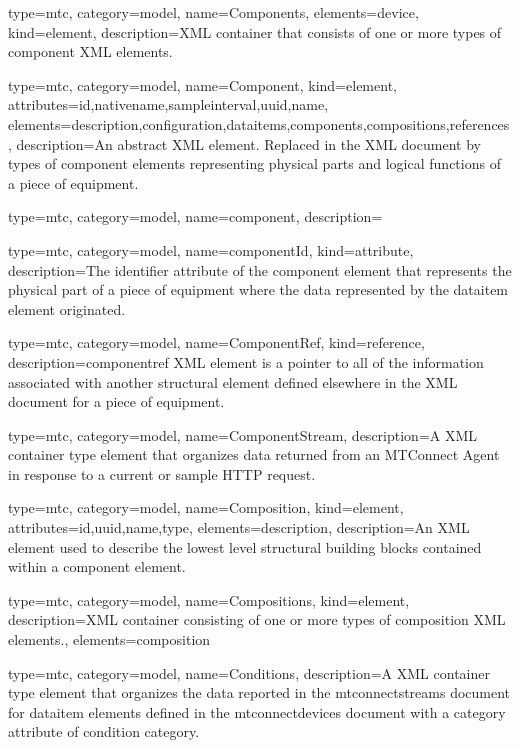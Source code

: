 {
  type=mtc,
  category=model,
  name={Components},
  elements={\gls{device}},
  kind={element},
  description={XML container that consists of one or more types of \gls{component} XML elements. } 
}


{
  type=mtc,
  category=model,
  name={Component},
  kind={element},
  attributes={\gls{id},\gls{nativename},\gls{sampleinterval},\gls{uuid},\gls{name}},
  elements={\gls{description},\gls{configuration},\gls{dataitems},\gls{components},\glspl{composition},\gls{references}},
  description={An abstract XML element. Replaced in the XML document by types of \gls{component} elements representing physical parts and logical functions of a piece of equipment.}
}


{
  type=mtc,
  category=model,
  name={component},
  description={}
}


{
  type=mtc,
  category=model,
  name={componentId},
  kind={attribute},
  description={The identifier attribute of the \gls{component} element that represents the physical part of a piece of equipment where the data represented by the \gls{dataitem} element originated.}
}


{
  type=mtc,
  category=model,
  name={ComponentRef},
  kind={reference},
  description={\gls{componentref} XML element is a pointer to all of the information associated with another \gls{structural element} defined elsewhere in the XML document for a piece of equipment. } 
}


{
  type=mtc,
  category=model,
  name={ComponentStream},
  description={A XML container type element that organizes data returned from an MTConnect Agent in response to a current or sample HTTP request.} 
}


{
  type=mtc,
  category=model,
  name={Composition},
  kind={element},
  attributes={\gls{id},\gls{uuid},\gls{name},\gls{type}},
  elements={\gls{description}},
  description={An XML element used to describe the lowest level structural building blocks contained within a \gls{component} element.}
}


{
  type=mtc,
  category=model,
  name={Compositions},
  kind={element},
  description={XML container consisting of one or more types of \gls{composition} XML elements.},
  elements={\gls{composition}}
}


{
  type=mtc,
  category=model,
  name={Conditions},
  description={A XML container type element that organizes the data reported in the \glspl{mtconnectstream} document for \gls{dataitem} elements defined in the \glspl{mtconnectdevice} document with a \gls{category} attribute of \gls{condition category}.}
}


